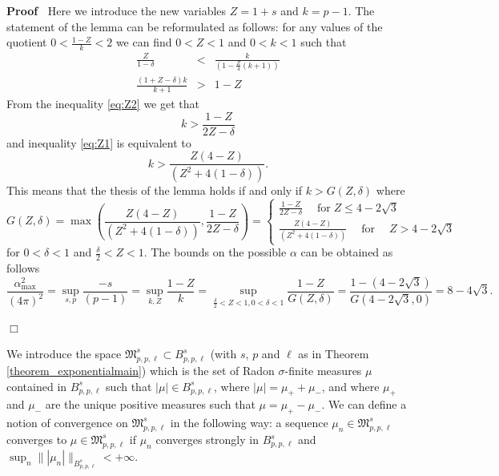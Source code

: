 \documentclass[a4paper,10pt]{article}
\newcommand{\tmop}[1]{\ensuremath{\operatorname{#1}}}
\newenvironment{proof}{\noindent\textbf{Proof\ }}{\hspace*{\fill}$\Box$\medskip}
\begin{document}
\begin{proof}
  Here we introduce the new variables $Z = 1 + s$ and $k = p - 1$. The
  statement of the lemma can be reformulated as follows: for any values of the
  quotient $0 < \frac{1 - Z}{k} < 2$ we can find $0 < Z < 1$ and $0 < k < 1$
  such that
  \begin{eqnarray}
    \frac{Z}{1 - \delta} & < & \frac{k}{\left( 1 - \frac{Z}{4} (k + 1)
    \right)}  \label{eq:Z1}\\
    \frac{(1 + Z - \delta) k}{k + 1} & > & 1 - Z  \label{eq:Z2}
  \end{eqnarray}
  From the inequality {\eqref{eq:Z2}} we get that
  \[ k > \frac{1 - Z}{2 Z - \delta} \]
  and inequality {\eqref{eq:Z1}} is equivalent to
  \[ k > \frac{Z (4 - Z)}{(Z^2 + 4 (1 - \delta))} . \]
  This means that the thesis of the lemma holds if and only if $k > G (Z,
  \delta)$ where
  \[ G (Z, \delta) = \max \left( \frac{Z (4 - Z)}{(Z^2 + 4 (1 - \delta))},
     \frac{1 - Z}{2 Z - \delta} \right) = \left\{ \begin{array}{l}
       \frac{1 - Z}{2 Z - \delta} \quad \tmop{for} Z \leqslant 4 - 2
       \sqrt{3}\\
       \frac{Z (4 - Z)}{(Z^2 + 4 (1 - \delta))} \quad \tmop{for} \quad Z > 4 -
       2 \sqrt{3}
     \end{array} \right. \]
  for $0 < \delta < 1$ and $\frac{\delta}{2} < Z < 1$. The bounds on the
  possible $\alpha$ can be obtained as follows
  \[ \frac{\alpha_{\max}^2}{(4 \pi)^2} = \sup_{s, p} \frac{- s}{(p - 1)} =
     \sup_{k, Z} \frac{1 - Z}{k} = \sup_{\frac{\delta}{2} < Z < 1, 0 < \delta
     < 1} \frac{1 - Z}{G (Z, \delta)} = \frac{1 - \left( 4 - 2 \sqrt{3}
     \right)}{G \left( 4 - 2 \sqrt{3}, 0 \right)} = 8 - 4 \sqrt{3} . \]
  
\end{proof}

We introduce the space $\mathfrak{M}^s_{p, p, \ell} \subset B^s_{p, p, \ell}$
(with $s$, $p$ and $\ell$ as in Theorem \ref{theorem_exponentialmain}) which
is the set of Radon $\sigma$-finite measures $\mu$ contained in $B^s_{p, p,
\ell}$ such that $| \mu | \in B^s_{p, p, \ell}$, where $| \mu | = \mu_+ +
\mu_-$, and where $\mu_+$ and $\mu_-$ are the unique positive measures such
that $\mu = \mu_+ - \mu_-$. We can define a notion of convergence on
$\mathfrak{M}^s_{p, p, \ell}$ in the following way: a sequence $\mu_n \in
\mathfrak{M}^s_{p, p, \ell}$ converges to $\mu \in \mathfrak{M}^s_{p, p,
\ell}$ if $\mu_n$ converges strongly in $B^s_{p, p, \ell}$ and $\sup_n \| |
\mu_n | \|_{B^s_{p, p, \ell}} < + \infty$.
\end{document}
